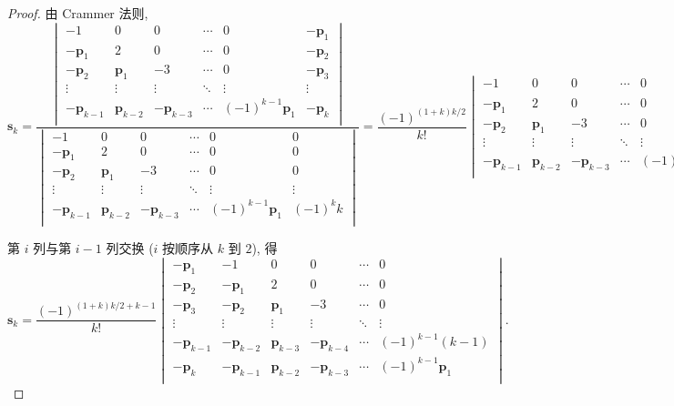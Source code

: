 \documentclass[color=black,device=normal,lang=cn,mode=geye]{elegantnote}
\begin{document}
\begin{landscape}
\begin{proof}
    由 Crammer 法则,
    \[\mathbf{s}_k=\dfrac{\begin{vmatrix}
        -1 & 0 & 0 & \cdots & 0 & -\mathbf{p}_1 \\
        -\mathbf{p}_1 & 2 & 0 & \cdots & 0 & -\mathbf{p}_2 \\
        -\mathbf{p}_2 & \mathbf{p}_1 & -3 & \cdots & 0 & -\mathbf{p}_3 \\
        \vdots & \vdots & \vdots & \ddots & \vdots & \vdots \\
        -\mathbf{p}_{k-1} & \mathbf{p}_{k-2} & -\mathbf{p}_{k-3} & \cdots & (-1)^{k-1}\mathbf{p}_1 & -\mathbf{p}_k \\
    \end{vmatrix}}{\begin{vmatrix}
        -1 & 0 & 0 & \cdots & 0 & 0 \\
        -\mathbf{p}_1 & 2 & 0 & \cdots & 0 & 0 \\
        -\mathbf{p}_2 & \mathbf{p}_1 & -3 & \cdots & 0 & 0 \\
        \vdots & \vdots & \vdots & \ddots & \vdots & \vdots \\
        -\mathbf{p}_{k-1} & \mathbf{p}_{k-2} & -\mathbf{p}_{k-3} & \cdots & (-1)^{k-1}\mathbf{p}_1 & (-1)^kk \\
    \end{vmatrix}}=\dfrac{(-1)^{(1+k)k/2}}{k!}\begin{vmatrix}
        -1 & 0 & 0 & \cdots & 0 & -\mathbf{p}_1 \\
        -\mathbf{p}_1 & 2 & 0 & \cdots & 0 & -\mathbf{p}_2 \\
        -\mathbf{p}_2 & \mathbf{p}_1 & -3 & \cdots & 0 & -\mathbf{p}_3 \\
        \vdots & \vdots & \vdots & \ddots & \vdots & \vdots \\
        -\mathbf{p}_{k-1} & \mathbf{p}_{k-2} & -\mathbf{p}_{k-3} & \cdots & (-1)^{k-1}\mathbf{p}_1 & -\mathbf{p}_k \\
    \end{vmatrix}\]

    第 $i$ 列与第 $i-1$ 列交换 ($i$ 按顺序从 $k$ 到 $2$), 得
    \[\mathbf{s}_k=\dfrac{(-1)^{(1+k)k/2+k-1}}{k!}\begin{vmatrix}
        -\mathbf{p}_1 & -1 & 0 & 0 & \cdots & 0 \\
        -\mathbf{p}_2 & -\mathbf{p}_1 & 2 & 0 & \cdots & 0 \\
        -\mathbf{p}_3 & -\mathbf{p}_2 & \mathbf{p}_1 & -3 & \cdots & 0 \\
        \vdots & \vdots & \vdots & \vdots & \ddots & \vdots \\
        -\mathbf{p}_{k-1} & -\mathbf{p}_{k-2} & \mathbf{p}_{k-3} & -\mathbf{p}_{k-4} & \cdots & (-1)^{k-1}(k-1) \\
        -\mathbf{p}_k & -\mathbf{p}_{k-1} & \mathbf{p}_{k-2} & -\mathbf{p}_{k-3} & \cdots & (-1)^{k-1}\mathbf{p}_1 \\
    \end{vmatrix}.\]


\end{proof}
\end{landscape}
\end{document}
